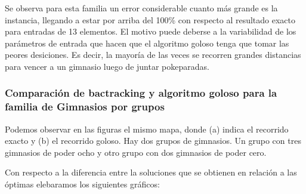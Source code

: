 Se observa para esta familia un error considerable cuanto más grande es la instancia, llegando a estar por arriba del 100\% con respecto al resultado exacto para entradas de 13 elementos. El motivo puede deberse a la variabilidad de los parámetros de entrada que hacen que el algoritmo goloso tenga que tomar las peores desiciones. Es decir, la mayoría de las veces se recorren grandes distancias para vencer a un gimnasio luego de juntar pokeparadas.

\subsubsection*{Comparación de bactracking y algoritmo goloso para la familia de Gimnasios por grupos} 

Podemos observar en las figuras el mismo mapa, donde (a) indica el recorrido exacto y (b) el recorrido goloso. Hay dos grupos de gimnasios. Un grupo con tres gimnasios de poder ocho y otro grupo con dos gimnasios de poder cero.

Con respecto a la diferencia entre la soluciones que se obtienen en relaci\'on a las \'optimas elebaramos los siguientes gráficos:\\

   \begin{figure}[h]
 \centering
       \label{fig:randomexacto}
    \label{fig:randomgoloso}
    \end{figure}


